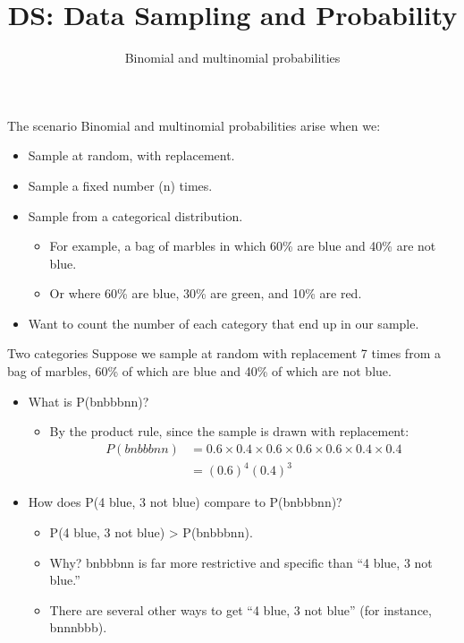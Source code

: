 \documentclass[aspectratio=169]{../latex_main/tntbeamer}  %
\title[Introduction]{DS: Data Sampling and Probability}
\subtitle{Binomial and multinomial probabilities}
\begin{document}
	
	\maketitle
	
	
	\begin{frame}{The scenario}
	Binomial and multinomial probabilities arise when we:
	\begin{itemize}
	    \item Sample at random, with replacement.
	    \item Sample a fixed number (n) times.
	    \item Sample from a categorical distribution.
	    \begin{itemize}
	        \item For example, a bag of marbles in which 60\% are blue and 40\% are not blue.
	        \item Or where 60\% are blue, 30\% are green, and 10\% are red.
	    \end{itemize}
	    \item Want to count the number of each category that end up in our sample.
	\end{itemize}

	\end{frame}
	
	
	\begin{frame}{Two categories}
	Suppose we sample at random with replacement 7 times from a bag of marbles, 60\% of which are blue and 40\% of which are not blue.

	\begin{itemize}
	    \item What is P(bnbbbnn)?
	    \begin{itemize}
	        \item By the product rule, since the sample is drawn with replacement:
            \begin{align*}
                P(bnbbbnn) &= 0.6 \times 0.4 \times 0.6 \times 0.6 \times 0.6 \times 0.4 \times 0.4 \\
                &= (0.6)^4 (0.4)^3
            \end{align*}
	    \end{itemize}
	    \item How does P(4 blue, 3 not blue) compare to P(bnbbbnn)?
	    \begin{itemize}
	        \item P(4 blue, 3 not blue) > P(bnbbbnn).
	        \item Why? bnbbbnn is far more restrictive and specific than “4 blue, 3 not blue.”
	        \item There are several other ways to get “4 blue, 3 not blue” (for instance, bnnnbbb).
	    \end{itemize}
	\end{itemize}

	\end{frame}
	
\end{document}
